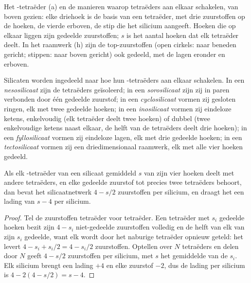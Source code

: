 \begin{omfigure}
{\small Het -tetraëder (a) en de manieren waarop tetraëders aan elkaar schakelen, van boven gezien: elke driehoek
is de basis van een tetraëder, met drie zuurstoffen op de hoeken, de vierde erboven, de stip die het silicium aangeeft.
Hoeken die op elkaar liggen zijn gedeelde zuurstoffen; $s$ is het aantal hoeken dat elk tetraëder deelt. In het raamwerk (h)
zijn de top-zuurstoffen (open cirkels: naar beneden gericht; stippen: naar boven gericht) ook gedeeld, met de lagen
eronder en erboven.}
\end{omfigure}

\begin{definition}[De silicaatklassen]\label{def:b1:rock-forming-minerals:silicate-classes}
Silicaten worden ingedeeld naar hoe hun -tetraëders aan elkaar schakelen. In een
\emph{nesosilicaat} zijn de tetraëders geïsoleerd; in een \emph{sorosilicaat}
zijn zij in paren verbonden door één gedeelde zuurstof; in een \emph{cyclosilicaat} vormen zij
gesloten ringen, elk met twee gedeelde hoeken; in een \emph{inosilicaat} vormen zij eindeloze ketens,
enkelvoudig (elk tetraëder deelt twee hoeken) of dubbel (twee enkelvoudige ketens naast elkaar, de helft van de
tetraëders deelt drie hoeken); in een \emph{fyllosilicaat} vormen zij eindeloze lagen, elk met drie
gedeelde hoeken; in een \emph{tectosilicaat} vormen zij een driedimensionaal raamwerk, elk met alle
vier hoeken gedeeld.
\end{definition}

\begin{proposition}\label{prop:b1:rock-forming-minerals:si-o}
Als elk -tetraëder van een silicaat gemiddeld $s$ van zijn vier hoeken deelt met andere tetraëders, en elke
gedeelde zuurstof tot precies twee tetraëders behoort, dan bevat het silicaatnetwerk $4 - s/2$ zuurstoffen per silicium,
en draagt het een lading van $s - 4$ per silicium.
\end{proposition}

\begin{proof}
Tel de zuurstoffen tetraëder voor tetraëder. Een tetraëder met $s_i$ gedeelde hoeken bezit zijn $4 - s_i$ niet-gedeelde
zuurstoffen volledig en de helft van elk van zijn $s_i$ gedeelde, want elk wordt door het naburige tetraëder opnieuw geteld:
het levert $4 - s_i + s_i/2 = 4 - s_i/2$ zuurstoffen. Optellen over $N$ tetraëders en delen door $N$ geeft $4 - s/2$ zuurstoffen
per silicium, met $s$ het gemiddelde van de $s_i$. Elk silicium brengt een lading $+4$ en elke zuurstof $-2$, dus de lading per
silicium is $4 - 2(4 - s/2) = s - 4$.
\end{proof}


